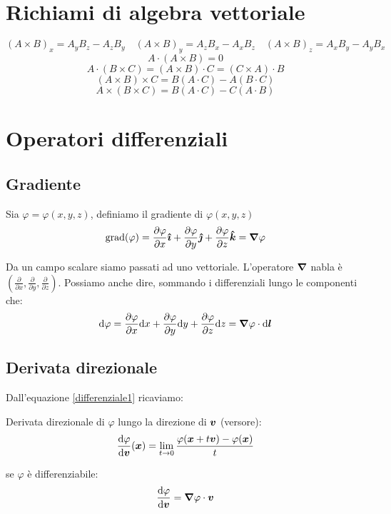 \section{Richiami di algebra vettoriale}
\begin{equation*}
(A\times B)_x=A_yB_z-A_zB_y\quad(A\times B)_y=A_zB_x-A_xB_z\quad(A\times B)_z=A_xB_y-A_yB_x
\end{equation*}
\begin{equation*}A\cdot(A\times B)=0\end{equation*}
\begin{equation*}A\cdot(B\times C)=(A\times B)\cdot C=(C\times A)\cdot B\end{equation*}
\begin{equation*}(A\times B)\times C=B(A\cdot C)-A(B\cdot C)\end{equation*}
\begin{equation*}A\times(B\times C)=B(A\cdot C)-C(A\cdot B)\end{equation*}
\section{Operatori differenziali}
\subsection{Gradiente}
\begin{Def}
Sia $\varphi=\varphi(x,y,z)$, definiamo il gradiente di $\varphi(x,y,z)$
\begin{equation*}\operatorname{grad}({\varphi})=\frac{\partial \varphi}{\partial x}\boldsymbol{\hat {\imath}}+\frac{\partial \varphi}{\partial y}\boldsymbol{\hat {\jmath}}+\frac{\partial\varphi}{\partial z}\boldsymbol{\hat {k}}=\boldsymbol{\nabla}\varphi\end{equation*}
\end{Def}
Da un campo scalare siamo passati ad uno vettoriale. L'operatore $\boldsymbol{\nabla}$ nabla è $\left(\frac{\partial}{\partial x},\frac{\partial}{\partial y},\frac{\partial}{\partial z}\right)$. Possiamo anche dire, sommando i differenziali lungo le componenti che:
\begin{equation}
\label{differenziale1}
\mathrm{d} \varphi=\frac{\partial\varphi}{\partial x}\mathrm{d} x+\frac{\partial\varphi}{\partial y}\mathrm{d} y+\frac{\partial\varphi}{\partial z}\mathrm{d} z=\boldsymbol{\nabla}\varphi\cdot\mathrm{d} \boldsymbol{l}\end{equation}
\subsection{Derivata direzionale}
Dall'equazione \eqref{differenziale1} ricaviamo:
\begin{Def}Derivata direzionale di $\varphi$ lungo la direzione di $\boldsymbol{v}$ (versore):
\begin{equation}
\frac{\mathrm{d}\varphi}{\mathrm{d} \boldsymbol{v}}(\boldsymbol{x})=\lim_{t\to 0}\frac{\varphi(\boldsymbol{x}+t\boldsymbol{v})-\varphi(\boldsymbol{x})}{t}
\end{equation}
\end{Def}
se $\varphi$ è differenziabile:
\begin{equation}
\label{differenziale2}
\frac{\mathrm{d} \varphi}{\mathrm{d} \boldsymbol{v}}=\boldsymbol{\nabla}\varphi\cdot{\boldsymbol{v}}
\end{equation}


